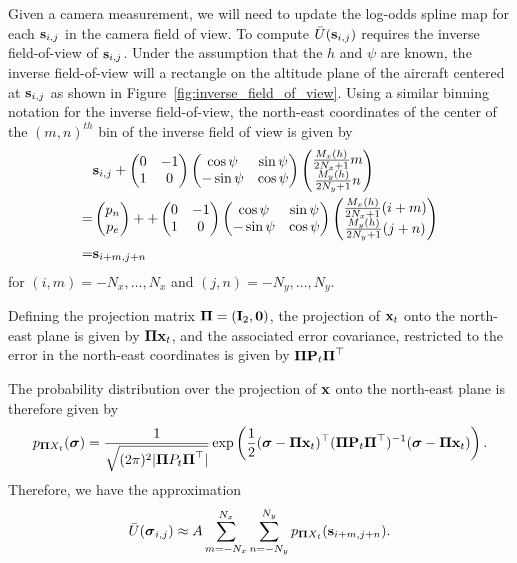 Given a camera measurement, we will need to update the log-odds spline map for each $\mathbf{s}_{i,j}$ in the camera field of view. To compute $\bar{U}(\mathbf{s}_{i,j})$ requires the inverse field-of-view of $\mathbf{s}_{i,j}$.  Under the assumption that the $h$ and $\psi$ are known, the inverse field-of-view will a rectangle on the altitude plane of the aircraft centered at $\mathbf{s}_{i,j}$ as shown in Figure~\ref{fig:inverse_field_of_view}.  Using a similar binning notation for the inverse field-of-view, the north-east coordinates of the center of the $(m,n)^{th}$ bin of the inverse field of view is given by
\begin{align*}
&\mathbf{s}_{i,j} + \begin{pmatrix} 0 & -1 \\ 1 & 0 \end{pmatrix} \begin{pmatrix}\cos\psi & \sin\psi \\ -\sin\psi & \cos\psi \end{pmatrix}\begin{pmatrix} \frac{M_x(h)}{2N_x+1} m \\ \frac{M_y(h)}{2N_y+1} n \end{pmatrix} \\
=& \begin{pmatrix} p_n \\ p_e \end{pmatrix} + + \begin{pmatrix} 0 & -1 \\ 1 & 0 \end{pmatrix} \begin{pmatrix}\cos\psi & \sin\psi \\ -\sin\psi & \cos\psi \end{pmatrix}\begin{pmatrix} \frac{M_x(h)}{2N_x+1} (i+m) \\ \frac{M_y(h)}{2N_y+1} (j+n) \end{pmatrix} \\
=& \mathbf{s}_{i+m, j+n}
\end{align*}
for $(i,m)=-N_x, \dots, N_x$ and $(j,n)=-N_y, \dots, N_y$.

Defining the projection matrix $\boldsymbol{\Pi} = (\mathbf{I}_2, \mathbf{0})$, the projection of $\mathbf{x}_t$ onto the north-east plane is given by $\boldsymbol{\Pi}\mathbf{x}_t$, and the associated error covariance, restricted to the error in the north-east coordinates is given by $\boldsymbol{\Pi} \mathbf{P}_t \boldsymbol{\Pi}^\top$

 The probability distribution over the projection of $\mathbf{x}$ onto the north-east plane is therefore given by
\[
p_{\boldsymbol{\Pi} X_t}(\boldsymbol{\sigma}) = \frac{1}{\sqrt{(2\pi)^2|\boldsymbol{\Pi} P_t \boldsymbol{\Pi}^\top|}}\exp\left(\frac{1}{2}(\boldsymbol{\sigma}-\boldsymbol{\Pi}\mathbf{x}_t)^\top (\boldsymbol{\Pi} \mathbf{P}_t\boldsymbol{\Pi}^\top)^{-1}(\boldsymbol{\sigma}-\boldsymbol{\Pi}\mathbf{x}_t)\right).
\]
Therefore, we have the approximation
\begin{equation}\label{eq:approximation_of_Ubar}
\bar{U}(\sigmabf_{i,j}) \approx A \sum_{m=-N_x}^{N_x} \sum_{n=-N_y}^{N_y} p_{\Pibf X_t}(\sbf_{i+m,j+n}).
\end{equation}

